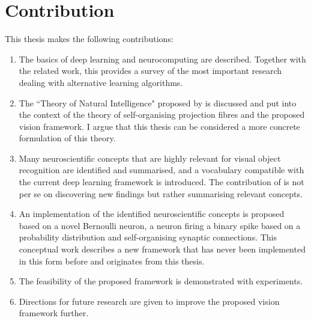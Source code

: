 \section{Contribution}
This thesis makes the following contributions:
\begin{enumerate}
	\item The basics of deep learning and neurocomputing are described. Together with the related work, this provides a survey of the most important research dealing with alternative learning algorithms.
	\item The ``Theory of Natural Intelligence" proposed by  is discussed and put into the context of the theory of self-organising projection fibres  and the proposed vision framework. I argue that this thesis can be considered a more concrete formulation of this theory.
    \item Many neuroscientific concepts that are highly relevant for visual object recognition are identified and summarised, and a vocabulary compatible with the current deep learning framework is introduced. The contribution of  is not per se on discovering new findings but rather summarising relevant concepts.
	\item An implementation of the identified neuroscientific concepts is proposed based on a novel Bernoulli neuron,  a neuron firing a binary spike based on a probability distribution and self-organising synaptic connections. This conceptual work describes a new framework that has never been implemented in this form before and originates from this thesis. 
    \item The feasibility of the proposed framework is demonstrated with experiments.
    \item Directions for future research are given to improve the proposed vision framework further.
\end{enumerate}


